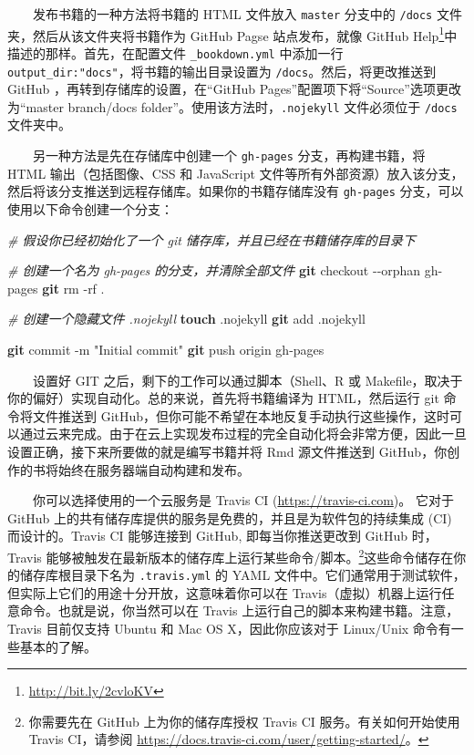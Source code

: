 \documentclass[
  12pt,
]{krantz}
\newenvironment{Shaded}{\begin{snugshade}}{\end{snugshade}}
\newcommand{\AttributeTok}[1]{\textcolor[rgb]{0.13,0.29,0.53}{#1}}
\newcommand{\CommentTok}[1]{\textcolor[rgb]{0.56,0.35,0.01}{\textit{#1}}}
\newcommand{\FunctionTok}[1]{\textcolor[rgb]{0.13,0.29,0.53}{\textbf{#1}}}
\newcommand{\NormalTok}[1]{#1}
\newcommand{\StringTok}[1]{\textcolor[rgb]{0.31,0.60,0.02}{#1}}
\renewcommand{\href}[2]{#2\footnote{\url{#1}}}
\theoremstyle{definition}
\theoremstyle{definition}
\theoremstyle{definition}
\theoremstyle{definition}
\theoremstyle{remark}
\begin{document}
  发布书籍的一种方法将书籍的 HTML 文件放入 \texttt{master} 分支中的 \texttt{/docs} 文件夹，然后从该文件夹将书籍作为 GitHub Pagse 站点发布，就像 \href{http://bit.ly/2cvloKV}{GitHub Help}中描述的那样。首先，在配置文件 \texttt{\_bookdown.yml} 中添加一行 \texttt{output\_dir:"docs"}，将书籍的输出目录设置为 \texttt{/docs}。然后，将更改推送到 GitHub ，再转到存储库的设置，在``GitHub Pages''配置项下将``Source''选项更改为``master branch/docs folder''。使用该方法时，\texttt{.nojekyll} 文件必须位于 \texttt{/docs} 文件夹中。

  另一种方法是先在存储库中创建一个 \texttt{gh-pages} 分支，再构建书籍，将 HTML 输出（包括图像、CSS 和 JavaScript 文件等所有外部资源）放入该分支，然后将该分支推送到远程存储库。如果你的书籍存储库没有 \texttt{gh-pages} 分支，可以使用以下命令创建一个分支：

\begin{Shaded}
\begin{Highlighting}[]
\CommentTok{\# 假设你已经初始化了一个 git 储存库，并且已经在书籍储存库的目录下}

\CommentTok{\# 创建一个名为 gh{-}pages 的分支，并清除全部文件}
\FunctionTok{git}\NormalTok{ checkout }\AttributeTok{{-}{-}orphan}\NormalTok{ gh{-}pages}
\FunctionTok{git}\NormalTok{ rm }\AttributeTok{{-}rf}\NormalTok{ .}

\CommentTok{\# 创建一个隐藏文件 .nojekyll}
\FunctionTok{touch}\NormalTok{ .nojekyll}
\FunctionTok{git}\NormalTok{ add .nojekyll}

\FunctionTok{git}\NormalTok{ commit }\AttributeTok{{-}m} \StringTok{"Initial commit"}
\FunctionTok{git}\NormalTok{ push origin gh{-}pages}
\end{Highlighting}
\end{Shaded}

  设置好 GIT 之后，剩下的工作可以通过脚本（Shell、R 或 Makefile，取决于你的偏好）实现自动化。总的来说，首先将书籍编译为 HTML，然后运行 git 命令将文件推送到 GitHub，但你可能不希望在本地反复手动执行这些操作，这时可以通过云来完成。由于在云上实现发布过程的完全自动化将会非常方便，因此一旦设置正确，接下来所要做的就是编写书籍并将 Rmd 源文件推送到 GitHub，你创作的书将始终在服务器端自动构建和发布。

  你可以选择使用的一个云服务是 Travis CI (\url{https://travis-ci.com})。 它对于 GitHub 上的共有储存库提供的服务是免费的，并且是为软件包的持续集成 (CI) 而设计的。Travis CI 能够连接到 GitHub, 即每当你推送更改到 GitHub 时，Travis 能够被触发在最新版本的储存库上运行某些命令/脚本。\footnote{你需要先在 GitHub 上为你的储存库授权 Travis CI 服务。有关如何开始使用 Travis CI，请参阅 \url{https://docs.travis-ci.com/user/getting-started/}。}这些命令储存在你的储存库根目录下名为 \texttt{.travis.yml} 的 YAML 文件中。它们通常用于测试软件，但实际上它们的用途十分开放，这意味着你可以在 Travis（虚拟）机器上运行任意命令。也就是说，你当然可以在 Travis 上运行自己的脚本来构建书籍。注意，Travis 目前仅支持 Ubuntu 和 Mac OS X，因此你应该对于 Linux/Unix 命令有一些基本的了解。
\end{document}
